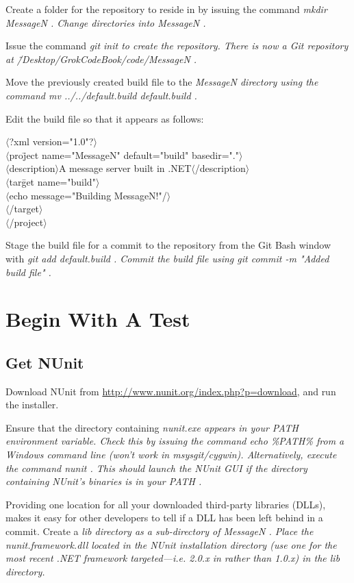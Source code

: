 Create a folder for the repository to reside in by issuing the command \em mkdir MessageN \em. Change directories into \em MessageN \em.

Issue the command \em git init \em to create the repository. There is now a Git repository at \em \~/Desktop/GrokCodeBook/code/MessageN \em.

Move the previously created build file to the \em MessageN \em directory using the command \em mv ../../default.build default.build \em.

Edit the build file so that it appears as follows:

\begin{tabbing}
$\langle$?xml version="1.0"?$\rangle$ \\
$\langle$pro\=ject name="MessageN" default="build" basedir="."$\rangle$ \\
\>$\langle$description$\rangle$A message server built in \CSharp.NET$\langle$/description$\rangle$ \\
\>$\langle$tar\=get name="build"$\rangle$ \\
\>\>$\langle$echo message="Building MessageN!"/$\rangle$ \\
\>$\langle$/target$\rangle$ \\
$\langle$/project$\rangle$
\end{tabbing}

Stage the build file for a commit to the repository from the Git Bash window with \em git add default.build \em. Commit the build file using \em git commit -m "Added build file" \em.

\section{Begin With A Test}

\subsection{Get NUnit}
Download NUnit from \url{http://www.nunit.org/index.php?p=download}, and run the installer.

Ensure that the directory containing \em nunit.exe \em appears in your \em PATH \em environment variable. Check this by issuing the command \em echo \%PATH\% \em from a Windows command line (won't work in msysgit/cygwin). Alternatively, execute the command \em nunit \em. This should launch the NUnit \gls{GUI} if the directory containing NUnit's binaries is in your \em PATH \em.

Providing one location for all your downloaded third-party libraries (DLLs), makes it easy for other developers to tell if a DLL has been left behind in a commit. Create a \em lib \em directory as a sub-directory of \em MessageN \em. Place the \em nunit.framework.dll \em located in the NUnit installation directory (use one for the most recent .NET framework targeted---i.e. 2.0.x in rather than 1.0.x) in the \em lib \em directory.

